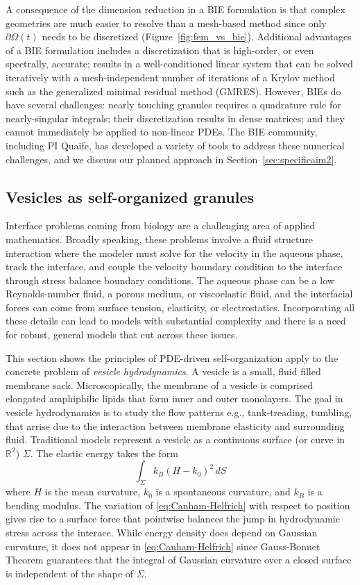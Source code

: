 A consequence of the dimension reduction in a BIE formulation is that
complex geometries are much easier to resolve than a mesh-based method
since only $\partial \Omega(t)$ needs to be discretized
(Figure~\ref{fig:fem_vs_bie}). Additional advantages of a BIE
formulation includes a discretization that is high-order, or even
spectrally, accurate; results in a well-conditioned linear system that
can be solved iteratively with a mesh-independent number of iterations
of a Krylov method such as the generalized minimal residual method
(GMRES). However, BIEs do have several challenges: nearly touching
granules requires a quadrature rule for nearly-singular integrals; their
discretization results in dense matrices; and they cannot immediately be
applied to non-linear PDEs. The BIE community, including PI Quaife, has
developed a variety of tools to address these numerical challenges, and
we discuss our planned approach in Section~\ref{sec:specificaim2}.


\subsection{Vesicles as self-organized granules}
\label{sec:vesicles_as_granules}
Interface problems coming from biology are a challenging
area of applied mathematics.  Broadly speaking, these problems
involve a fluid structure interaction where the modeler must
solve for the velocity in the aqueous phase, track the interface,
and couple the velocity boundary condition to the interface through
stress balance boundary conditions.  The aqueous phase can
be a low Reynolds-number fluid, a porous medium, or viscoelastic fluid,
and the interfacial forces can come from surface tension, elasticity,
or electrostatics.
Incorporating all these details can lead to models with substantial
complexity and there is a need for robust, general models that
cut across these issues. 

This section shows the principles of PDE-driven
self-organization apply to the concrete
problem of \emph{vesicle hydrodynamics}.
A vesicle is a small, fluid filled membrane sack.
Microscopically, the membrane of a vesicle is comprised
elongated amphiphilic lipids that form inner and outer monolayers.  
The goal in vesicle hydrodynamics is to study the flow patterns e.g.,
tank-treading, tumbling, that arrise due to the interaction
between membrane elasticity and surrounding fluid.
Traditional models represent a vesicle as a
continuous surface (or curve in $\mathbb{R}^2$) $\Sigma$.
The elastic energy takes the form
\begin{equation}
\label{eq:Canham-Helfrich}
  \int_{\Sigma} k_B(H - k_0)^2\, dS 
\end{equation}
where $H$ is the mean curvature, $k_0$ is a spontaneous curvature,
and $k_B$ is a bending modulus. 
The variation of \eqref{eq:Canham-Helfrich} with respect to position
gives rise to a surface force
that pointwise balances the jump in hydrodynamic stress across the interace.
While energy density does depend on Gaussian curvature,
it does not appear in \eqref{eq:Canham-Helfrich}
since Gauss-Bonnet Theorem guarantees that
the integral of Gaussian curvature over a closed surface is independent of the shape of $\Sigma$.

